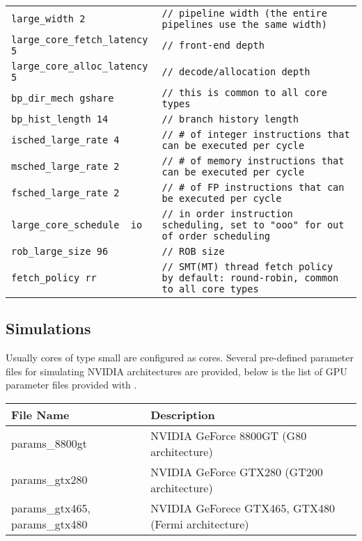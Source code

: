 \begin{tabular}{l l}
 \Verb+large_width 2+ & \Verb+// pipeline width (the entire pipelines use the same width)+ \\
 \Verb+large_core_fetch_latency 5+ & \Verb+// front-end depth+ \\
 \Verb+large_core_alloc_latency 5+ & \Verb+// decode/allocation depth+ \\
 \Verb+bp_dir_mech gshare+ & \Verb+// this is common to all core types+ \\
 \Verb+bp_hist_length 14+ & \Verb+// branch history length+ \\
 \Verb+isched_large_rate 4 + & \Verb+// # of integer instructions that can be executed per cycle+ \\
 \Verb+msched_large_rate 2+ & \Verb+// # of memory instructions that can be executed per cycle + \\
 \Verb+fsched_large_rate 2 + & \Verb+// # of FP instructions that can be executed per cycle+ \\
 \Verb+large_core_schedule  io + & \Verb+// in order instruction scheduling, set to "ooo" for out of order scheduling + \\
 \Verb+rob_large_size 96+ & \Verb+// ROB size+ \\
 \Verb+fetch_policy rr+ & \Verb+// SMT(MT) thread fetch policy  by default: round-robin, common to all core types+
\end{tabular}

\subsection{\gpu Simulations}

Usually cores of type small are configured as \gpu cores. Several pre-defined
parameter files for simulating NVIDIA architectures are provided, below is the
list of GPU parameter files provided with \SIM.

\begin{center}
 \begin{tabular}{| l | l |}
  \hline
  File Name & Description \\ \hline \hline
  params\_8800gt &  NVIDIA GeForce 8800GT (G80 architecture) \\
  params\_gtx280 &  NVIDIA GeForce GTX280 (GT200 architecture) \\
  params\_gtx465, params\_gtx480 & NVIDIA GeForece GTX465, GTX480 (Fermi architecture) \\
  \hline
 \end{tabular}
\end{center}

